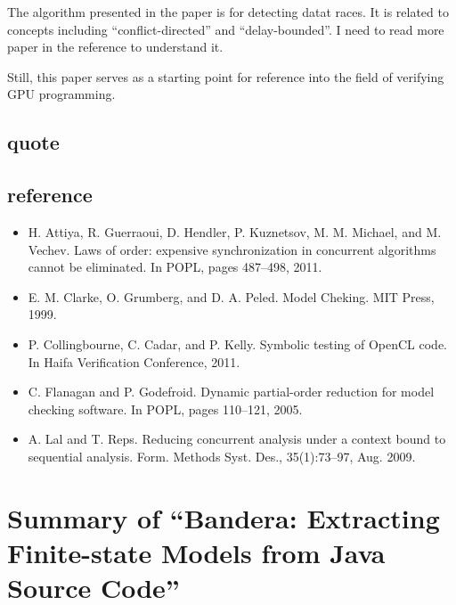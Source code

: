 \documentclass{llncs}
\begin{document}
The algorithm presented in the paper is for detecting datat races. It is related to
concepts including ``conflict-directed'' and ``delay-bounded''. I need to read
more paper in the reference to understand it.

Still, this paper serves as a starting point for reference into the field of
verifying GPU programming.
\subsection{quote}

\subsection{reference}
\begin{itemize}
\item H. Attiya, R. Guerraoui, D. Hendler, P. Kuznetsov, M. M. Michael, and M. Vechev.
Laws of order: expensive synchronization in concurrent algorithms cannot be eliminated. 
In POPL, pages 487--498, 2011. \cite{xxx}
\item E. M. Clarke, O. Grumberg, and D. A. Peled. Model Cheking. MIT Press, 1999.
\item P. Collingbourne, C. Cadar, and P. Kelly. Symbolic testing of OpenCL code. In
Haifa Verification Conference, 2011. \cite{xxx}
\item C. Flanagan and P. Godefroid. Dynamic partial-order reduction for model checking
software. In POPL, pages 110–121, 2005. \cite{xxx}
\item A. Lal and T. Reps. Reducing concurrent analysis under a context bound to
sequential analysis. Form. Methods Syst. Des., 35(1):73–97, Aug. 2009.
\cite{xxx}

\end{itemize}


\newpage
\section{Summary of ``Bandera: Extracting Finite-state Models from Java Source Code''\cite{Corbett2000Bandera}} 
  \label{section:bandera_java}
\end{document}
